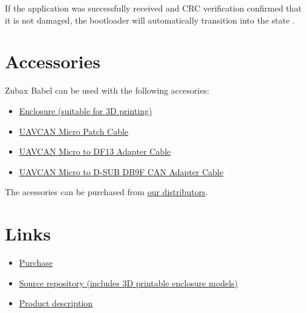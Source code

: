 \documentclass{zubaxdoc}
\begin{document}
If the application was successfully received and CRC verification confirmed that it is not damaged, the bootloader will automatically transition into the state .

\chapter{Accessories}

Zubax Babel can be used with the following accesories:
\begin{itemize}
\item \href{https://github.com/Zubax/zubax_babel/tree/master/hardware/enclosure}{Enclosure (suitable for 3D printing)}
\item \href{https://docs.zubax.com/uavcan#UAVCAN_Micro_Patch_Cable}{UAVCAN Micro Patch Cable}
\item \href{https://docs.zubax.com/uavcan#UAVCAN_Micro_to_DF13_Adapter_Cable}{UAVCAN Micro to DF13 Adapter Cable}
\item \href{https://docs.zubax.com/zubax_babel#UAVCAN_Micro_to_D-SUB_DB9F_CAN_Adapter_Cable}{UAVCAN Micro to D-SUB DB9F CAN Adapter Cable}
\end{itemize}

The acessories can be purchased from \href{https://zubax.com/sales-network}{our distributors}.

\chapter{Links}
\begin{itemize}
\item \href{http://shop.titaneliteinc.com/index.php?route=product/product&product_id=1004}{Purchase}
\item \href{https://github.com/Zubax/zubax_babel}{Source repository (includes 3D printable enclosure models)}
\item \href{http://zubax.com/product/zubax-babel}{Product description}
\end{itemize}
\end{document}
